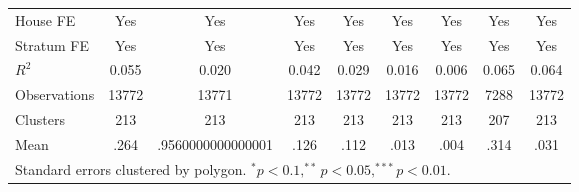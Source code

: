 {\begin{tabular}{l*{8}{c}}
House FE        &      Yes         &      Yes         &      Yes         &      Yes         &      Yes         &      Yes         &      Yes         &      Yes         \\
Stratum FE      &      Yes         &      Yes         &      Yes         &      Yes         &      Yes         &      Yes         &      Yes         &      Yes         \\
\hline
\(R^{2}\)       &    0.055         &    0.020         &    0.042         &    0.029         &    0.016         &    0.006         &    0.065         &    0.064         \\
Observations    &    13772         &    13771         &    13772         &    13772         &    13772         &    13772         &     7288         &    13772         \\
Clusters        &      213         &      213         &      213         &      213         &      213         &      213         &      207         &      213         \\
Mean            &     .264         &.9560000000000001         &     .126         &     .112         &     .013         &     .004         &     .314         &     .031         \\
\hline\hline
\multicolumn{9}{l}{\footnotesize \scriptsize{Standard errors clustered by polygon. $^* p<0.1, ^{**} p<0.05, ^{***} p<0.01$.}}\\
\end{tabular}
}
